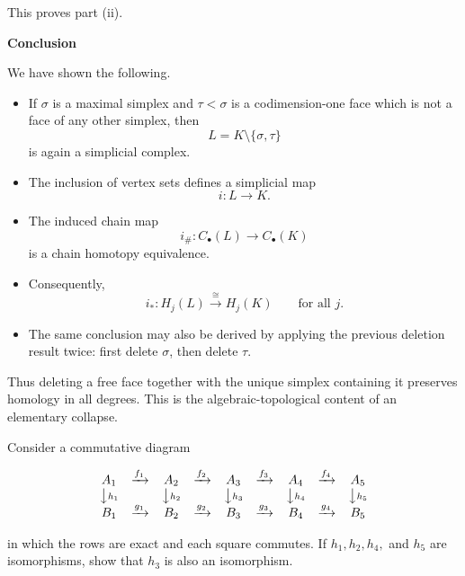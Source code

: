 \begin{solution}
This proves part (ii).


\medskip
\noindent\textbf{Conclusion}\par
\smallskip


We have shown the following.

\begin{itemize}
	\item If \(\sigma\) is a maximal simplex and \(\tau<\sigma\) is a codimension-one face which is not a face of any other simplex, then
	\[
	L=K\setminus\{\sigma,\tau\}
	\]
	is again a simplicial complex.

	\item The inclusion of vertex sets defines a simplicial map
	\[
	i:L\to K.
	\]

	\item The induced chain map
	\[
	i_\#:C_\bullet(L)\to C_\bullet(K)
	\]
	is a chain homotopy equivalence.

	\item Consequently,
	\[
	i_*:H_j(L)\xrightarrow{\cong} H_j(K)
	\qquad\text{for all } j.
	\]

	\item The same conclusion may also be derived by applying the previous deletion result twice: first delete \(\sigma\), then delete \(\tau\).
\end{itemize}

Thus deleting a free face together with the unique simplex containing it preserves homology in all degrees. This is the algebraic-topological content of an elementary collapse.
\end{solution}

\begin{problem}
Consider a commutative diagram


\[
\begin{array}{ccccccccc}
A_1&\xrightarrow{f_1}&A_2&\xrightarrow{f_2}&A_3&\xrightarrow{f_3}&A_4&\xrightarrow{f_4}&A_5\\
\big\downarrow{\scriptstyle h_1}&&\big\downarrow{\scriptstyle h_2}&&
\big\downarrow{\scriptstyle h_3}&&\big\downarrow{\scriptstyle h_4}&&
\big\downarrow{\scriptstyle h_5}\\
B_1&\xrightarrow{g_1}&B_2&\xrightarrow{g_2}&B_3&\xrightarrow{g_3}&B_4&\xrightarrow{g_4}&B_5
\end{array}
\]


in which the rows are exact and each square commutes. If \(h_1,h_2,h_4,\) and \(h_5\) are isomorphisms, show that \(h_3\) is also an isomorphism.


\end{problem}

